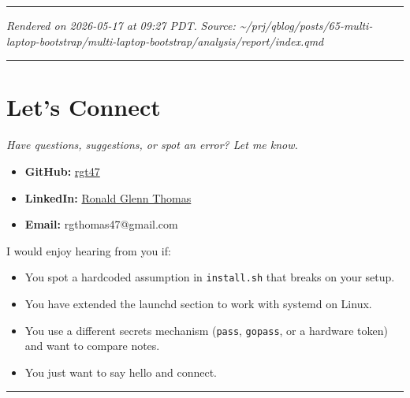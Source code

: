 \documentclass[
  11pt,
  letterpaper,
  DIV=11,
  numbers=noendperiod]{scrartcl}
\providecommand{\tightlist}{%
  \setlength{\itemsep}{0pt}\setlength{\parskip}{0pt}}
\begin{document}
\begin{center}\rule{0.5\linewidth}{0.5pt}\end{center}

\emph{Rendered on 2026-05-17 at 09:27 PDT.} \emph{Source:
\textasciitilde/prj/qblog/posts/65-multi-laptop-bootstrap/multi-laptop-bootstrap/analysis/report/index.qmd}

\begin{center}\rule{0.5\linewidth}{0.5pt}\end{center}

\section{Let's Connect}\label{lets-connect}

\emph{Have questions, suggestions, or spot an error? Let me know.}

\begin{itemize}
\tightlist
\item
  \textbf{GitHub:} \href{https://github.com/rgt47}{rgt47}
\item
  \textbf{LinkedIn:} \href{https://linkedin.com/in/rgthomaslab}{Ronald
  Glenn Thomas}
\item
  \textbf{Email:} rgthomas47@gmail.com
\end{itemize}

I would enjoy hearing from you if:

\begin{itemize}
\tightlist
\item
  You spot a hardcoded assumption in \texttt{install.sh} that breaks on
  your setup.
\item
  You have extended the launchd section to work with systemd on Linux.
\item
  You use a different secrets mechanism (\texttt{pass}, \texttt{gopass},
  or a hardware token) and want to compare notes.
\item
  You just want to say hello and connect.
\end{itemize}

\begin{center}\rule{0.5\linewidth}{0.5pt}\end{center}
\end{document}
